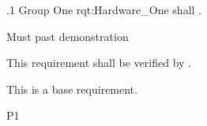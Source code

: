 \ONERQMTV
{\RqtNumberBase.1}
{Group One}
{rqt:Hardware_One}
{\ThisSys shall \TBD.}
{
	\item [Phase 1] Must past demonstration
}
{This requirement shall be verified by \TBD.}
{
\item [N/A] This is a base requirement.
}
{
	\item \TBD
}
{P1}


